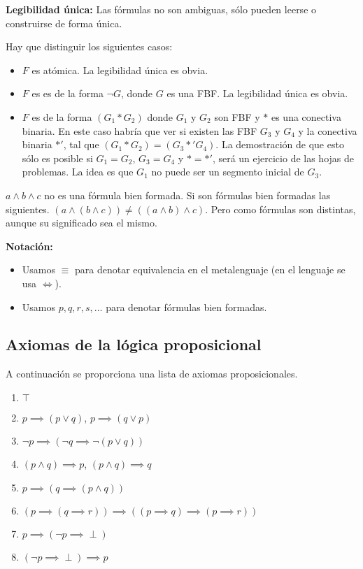 \begin{prop}{\textbf{Legibilidad única:}}
	Las fórmulas no son ambiguas, sólo pueden leerse o construirse de forma única.
\end{prop}
Hay que distinguir los siguientes casos:
\begin{itemize}
	\item $F$ es atómica. La legibilidad única es obvia.
	\item $F$ es es de la forma $\neg G$, donde $G$ es una FBF. La legibilidad única es obvia.
	\item $F$ es de la forma $(G_1\ast G_2)$ donde $G_1$ y $G_2$ son FBF y $\ast$ es una conectiva binaria. En este caso habría que ver si existen las FBF $G_3$ y $G_4$ y la conectiva binaria $\ast'$, tal que $(G_1\ast G_2) = (G_3\ast ' G_4)$. La demostración de que esto sólo es posible si $G_1=G_2$, $G_3=G_4$ y $\ast = \ast'$, será un ejercicio de las hojas de problemas. La idea es que $G_1$ no puede ser un segmento inicial de $G_3$.
\end{itemize}

\begin{obs}
	$a\wedge b \wedge c$ no es una fórmula bien formada. Si son fórmulas bien formadas las siguientes. $(a\wedge (b\wedge c)) \neq ((a\wedge b) \wedge c)$. Pero como fórmulas son distintas, aunque su significado sea el mismo.
\end{obs}

\begin{mdframed}
	\textbf{Notación:} 
	\begin{itemize}
	\vspace{-3mm}
	\item Usamos $\equiv$ para denotar equivalencia en el metalenguaje (en el lenguaje se usa $\iff$).
	
	\item Usamos $p,q,r,s,\hdots$ para denotar fórmulas bien formadas.
	\end{itemize}
\end{mdframed}




\subsection{Axiomas de la lógica proposicional}
A continuación se proporciona una lista de axiomas proposicionales.
\begin{enumerate}
	\item $\top$
	\item $p\implies (p\vee q)$, $p\implies (q\vee p)$
	\item $\neg p \implies (\neg q \implies \neg (p\vee q))$
	\item $(p\wedge q)\implies p$, $(p\wedge q)\implies q$
	\item $p\implies (q\implies (p\wedge q))$
	\item $(p\implies(q\implies r))\implies ((p\implies q)\implies(p\implies r))$
	\item $p\implies(\neg p\implies \perp)$
	\item $(\neg p\implies \perp)\implies p$
\end{enumerate}

